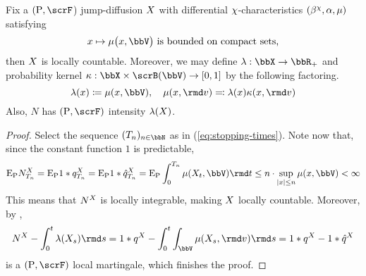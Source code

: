 \begin{lemma}
  \label{lemma:countable}
  Fix a $(\Prb, \scrF$) jump-diffusion $X$ with differential $\chi$-characteristics $(\beta^\chi, \alpha, \mu)$ satisfying
  \begin{equation*}
    \stateVar \mapsto \affJump\big(\stateVar, \vecSpace\big) \text{ is bounded on compact sets,}
  \end{equation*}
  then $X$ is locally countable.
  Moreover, we may define $\affInt: \stateSpace \rightarrow \bbR_+$ and probability kernel $\affDist: \stateSpace \times \scrB(\vecSpace) \rightarrow [0,1]$ by the following factoring.
  \begin{equation*}
    \affInt(\stateVar) \defeq \affJump(\stateVar, \vecSpace), \quad \affJump(\stateVar, \rmd\markVar) \eqdef \affInt(\stateVar) \affDist(\stateVar, \rmd\markVar)
  \end{equation*}
  Also, $N$ has $(\Prb, \scrF)$ intensity $\lambda(X)$.
\end{lemma}
\begin{proof}
  \label{proof:lemma:countable}
  Select the sequence $(T_n)_{n\in\bbN}$ as in (\ref{eq:stopping-times}).
  Note now that, since the constant function $1$ is predictable,
  \begin{equation*}
    \Exp_\Prb \N^\X_{T_n}
    = \Exp_\Prb 1 \ast \jumpMeas^\X_{T_n}
    = \Exp_\Prb 1 \ast \predproj{\jumpMeas^\X}_{T_n}
    = \Exp_\Prb \int_0^{T_n} \affJump(\X_t, \vecSpace) \rmd t
    \leq n \cdot \sup_{|\stateVar| \leq n} \affJump(\stateVar, \vecSpace) < \infty
  \end{equation*}
  This means that $N^X$ is locally integrable, making $X$ locally countable.
  Moreover, by \cite[Theorem II.1.8]{jacod2003},
  \begin{equation*}
    \N^\X - \int_0^t \affInt(\X_s) \rmd s
    = 1 \ast \jumpMeas^\X - \int_0^t \int_\vecSpace \affJump(\X_s, \rmd\markVar) \rmd s
    = 1 \ast \jumpMeas^\X - 1 \ast \predproj{\jumpMeas^\X}
  \end{equation*}
  is a $(\Prb, \scrF)$ local martingale, which finishes the proof.
\end{proof}
